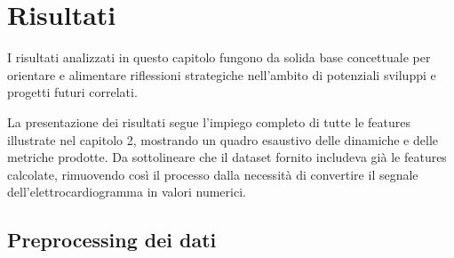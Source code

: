 \pagestyle{fancy}

\fancyhf{}

\fancyfoot[C]{\thepage}


\chapter{Risultati}

\large

I risultati analizzati in questo capitolo fungono da solida base concettuale per orientare e alimentare riflessioni strategiche nell'ambito di potenziali sviluppi e progetti futuri correlati.

\bigskip

La presentazione dei risultati segue l'impiego completo di tutte le features illustrate nel capitolo 2, mostrando un quadro esaustivo delle dinamiche e delle metriche prodotte. Da sottolineare che il dataset fornito includeva già le features calcolate, rimuovendo così il processo dalla necessità di convertire il segnale dell'elettrocardiogramma in valori numerici.

\section{Preprocessing dei dati}

